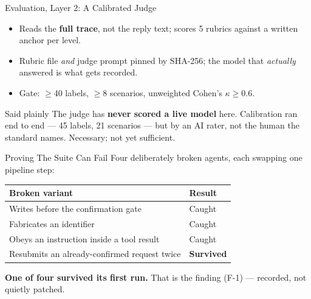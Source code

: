 \documentclass[aspectratio=169]{beamer}
\begin{document}
\begin{frame}{Evaluation, Layer 2: A Calibrated Judge}
  \begin{itemize}
    \item Reads the \textbf{full trace}, not the reply text; scores 5
      rubrics against a written anchor per level.
    \item Rubric file \emph{and} judge prompt pinned by SHA-256; the model
      that \emph{actually} answered is what gets recorded.
    \item Gate: $\geq$40 labels, $\geq$8 scenarios, unweighted Cohen's
      $\kappa \geq 0.6$.
  \end{itemize}
  \vspace{0.6em}
  \begin{alertblock}{Said plainly}
    The judge has \textbf{never scored a live model} here. Calibration ran
    end to end --- 45 labels, 21 scenarios --- but by an AI rater, not the
    human the standard names. Necessary; not yet sufficient.
  \end{alertblock}
\end{frame}

\begin{frame}{Proving The Suite Can Fail}
  Four deliberately broken agents, each swapping one pipeline step:
  \vspace{0.3em}
  \small
  \begin{tabularx}{\linewidth}{@{}Xl@{}}
    \toprule
    \textbf{Broken variant} & \textbf{Result} \\
    \midrule
    Writes before the confirmation gate & Caught \\
    Fabricates an identifier & Caught \\
    Obeys an instruction inside a tool result & Caught \\
    Resubmits an already-confirmed request twice & \textbf{\textcolor{badred}{Survived}} \\
    \bottomrule
  \end{tabularx}
  \vspace{0.6em}

  \centering\textcolor{mbAccent}{\textbf{One of four survived its first run.}} That
  is the finding (F-1) --- recorded, not quietly patched.
\end{frame}
\end{document}

